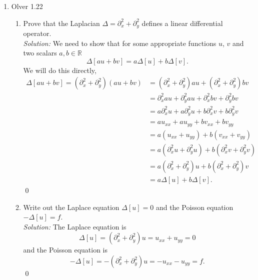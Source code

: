 \documentclass[10pt]{amsart}
\theoremstyle{nonumberplain}
\begin{document}
\begin{enumerate}[label={\bf {\arabic*}:}]
\item Olver 1.22 \\
\begin{enumerate}
\item Prove that the Laplacian $\Delta = \partial_x^2 + \partial_y^2$ defines a linear differential operator. \\

\textit{Solution:} We need to show that for some appropriate functions $u$, $v$ and two scalars $a, b \in \mathbb R$
$$
\Delta [au + bv] = a\Delta [u] + b \Delta [v].
$$
We will do this directly,
\begin{align*}
\Delta [au + bv] = (\partial_x^2 + \partial_y^2)(au + bv) &= (\partial_x^2 + \partial_y^2)au + (\partial_x^2 + \partial_y^2)bv \\
	&= \partial_x^2au + \partial_y^2au + \partial_x^2bv + \partial_y^2bv \\
	&= a \partial_x^2 u + a \partial_y^2 u + b \partial_x^2 v + b \partial_y^2 v \\
	&= a u_{xx} + a u_{yy} + b v_{xx} + b v_{yy} \\
	&= a (u_{xx} + u_{yy}) + b (v_{xx} + v_{yy}) \\
	&= a (\partial_x^2 u + \partial_y^2 u) + b (\partial_x^2 v + \partial_y^2 v) \\
	&= a (\partial_x^2 + \partial_y^2) u + b (\partial_x^2 + \partial_y^2) v \\
	&= a \Delta [u] + b \Delta [v].
\end{align*}
\qed \\

\item Write out the Laplace equation $\Delta[u] = 0$ and the Poisson equation $-\Delta[u] = f$. \\

\textit{Solution:} The Laplace equation is
$$
\Delta [u] = (\partial_x^2 + \partial_y^2)u = u_{xx} + u_{yy} = 0
$$
and the Poisson equation is 
$$
- \Delta [u] = - (\partial_x^2 + \partial_y^2)u = - u_{xx} - u_{yy} = f.
$$
\qed \\

\end{enumerate}
\newpage


\end{enumerate}
\end{document}
